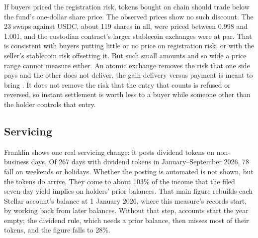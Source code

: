 \documentclass[12pt,a4paper]{article}
\begin{document}
If buyers priced the registration risk, tokens bought on chain should trade below the fund's one-dollar share price. The observed prices show no such discount. The 23 swaps against USDC, about 119 shares in all, were priced between 0.998 and 1.001, and the custodian contract's larger stablecoin exchanges were at par. That is consistent with buyers putting little or no price on registration risk, or with the seller's stablecoin risk offsetting it. But such small amounts and so wide a price range cannot measure either. An atomic exchange removes the risk that one side pays and the other does not deliver, the gain delivery versus payment is meant to bring \citep[pp.~31, 42]{ChiuKoeppl2019}. It does not remove the risk that the entry that counts is refused or reversed, so instant settlement is worth less to a buyer while someone other than the holder controls that entry.

\subsection{Servicing}\label{sec:m4}
Franklin shows one real servicing change: it posts dividend tokens on non-business days. Of 267 days with dividend tokens in January--September 2026, 78 fall on weekends or holidays. Whether the posting is automated is not shown, but the tokens do arrive. They come to about 103\% of the income that the filed seven-day yield implies on holders' prior balances. That main figure rebuilds each Stellar account's balance at 1 January 2026, where this measure's records start, by working back from later balances. Without that step, accounts start the year empty; the dividend rule, which needs a prior balance, then misses most of their tokens, and the figure falls to 28\%.
\end{document}
